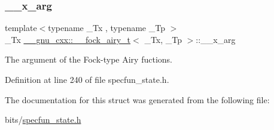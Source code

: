 \subsubsection{\texorpdfstring{\+\_\+\+\_\+x\+\_\+arg}{\_\_x\_arg}}
{\footnotesize\ttfamily template$<$typename \+\_\+\+Tx , typename \+\_\+\+Tp $>$ \\
\+\_\+\+Tx \hyperlink{struct____gnu__cxx_1_1____fock__airy__t}{\+\_\+\+\_\+gnu\+\_\+cxx\+::\+\_\+\+\_\+fock\+\_\+airy\+\_\+t}$<$ \+\_\+\+Tx, \+\_\+\+Tp $>$\+::\+\_\+\+\_\+x\+\_\+arg}



The argument of the Fock-\/type Airy fuctions. 



Definition at line 240 of file specfun\+\_\+state.\+h.



The documentation for this struct was generated from the following file\+:\begin{DoxyCompactItemize}
\item 
bits/\hyperlink{specfun__state_8h}{specfun\+\_\+state.\+h}\end{DoxyCompactItemize}
